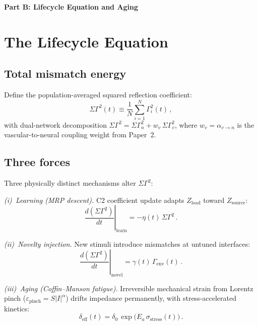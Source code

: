\documentclass[aps,pre,twocolumn,superscriptaddress,floatfix]{revtex4-2}
\begin{document}
\bigskip\noindent\textbf{\large Part B: Lifecycle Equation and Aging}
\bigskip
\label{part:B}


\section{The Lifecycle Equation}
\label{sec:lifecycle}

\subsection{Total mismatch energy}

Define the population-averaged squared reflection coefficient:
\begin{equation}
  \Sigma\Gamma^2(t) \equiv
    \frac{1}{N} \sum_{i=1}^{N} \Gamma_i^2(t)\,,
  \label{eq:sigma-gamma}
\end{equation}
with dual-network decomposition
$\Sigma\Gamma^2 = \Sigma\Gamma_n^2 + w_v\,\Sigma\Gamma_v^2$,
where $w_v = \alpha_{v\to n}$ is the vascular-to-neural
coupling weight from Paper~2.

\subsection{Three forces}

Three physically distinct mechanisms alter $\Sigma\Gamma^2$:

\emph{(i)~Learning (MRP descent).}
C2 coefficient update adapts $Z_{\mathrm{load}}$ toward
$Z_{\mathrm{source}}$:
\begin{equation}
  \left.\frac{d(\Sigma\Gamma^2)}{dt}\right|_{\mathrm{learn}}
    = -\eta(t)\,\Sigma\Gamma^2\,.
  \label{eq:learning-term}
\end{equation}

\emph{(ii)~Novelty injection.}
New stimuli introduce mismatches at untuned interfaces:
\begin{equation}
  \left.\frac{d(\Sigma\Gamma^2)}{dt}\right|_{\mathrm{novel}}
    = \gamma(t)\,\Gamma_{\mathrm{env}}(t)\,.
  \label{eq:novelty-term}
\end{equation}

\emph{(iii)~Aging (Coffin--Manson fatigue).}
Irreversible mechanical strain from Lorentz pinch
($\varepsilon_{\mathrm{pinch}} = S|I|^\alpha$)
drifts impedance permanently, with stress-accelerated
kinetics:
\begin{equation}
  \delta_{\mathrm{eff}}(t) = \delta_0\,
    \exp\!\bigl(E_a\,\sigma_{\mathrm{stress}}(t)\bigr)\,.
  \label{eq:arrhenius-aging}
\end{equation}
\end{document}
